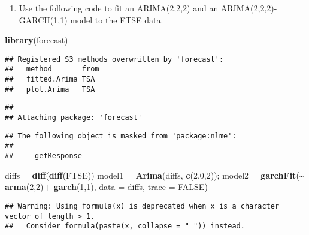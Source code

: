 \documentclass[
]{article}
\newenvironment{Shaded}{\begin{snugshade}}{\end{snugshade}}
\newcommand{\DataTypeTok}[1]{\textcolor[rgb]{0.13,0.29,0.53}{#1}}
\newcommand{\DecValTok}[1]{\textcolor[rgb]{0.00,0.00,0.81}{#1}}
\newcommand{\KeywordTok}[1]{\textcolor[rgb]{0.13,0.29,0.53}{\textbf{#1}}}
\newcommand{\NormalTok}[1]{#1}
\newcommand{\OperatorTok}[1]{\textcolor[rgb]{0.81,0.36,0.00}{\textbf{#1}}}
\newcommand{\OtherTok}[1]{\textcolor[rgb]{0.56,0.35,0.01}{#1}}
\newcommand{\StringTok}[1]{\textcolor[rgb]{0.31,0.60,0.02}{#1}}
\providecommand{\tightlist}{%
  \setlength{\itemsep}{0pt}\setlength{\parskip}{0pt}}
\begin{document}
\begin{enumerate}
\def\labelenumi{(\alph{enumi})}
\tightlist
\item
  Use the following code to fit an ARIMA(2,2,2) and an
  ARIMA(2,2,2)-GARCH(1,1) model to the FTSE data.
\end{enumerate}

\begin{Shaded}
\begin{Highlighting}[]
\KeywordTok{library}\NormalTok{(forecast)}
\end{Highlighting}
\end{Shaded}

\begin{verbatim}
## Registered S3 methods overwritten by 'forecast':
##   method       from
##   fitted.Arima TSA 
##   plot.Arima   TSA
\end{verbatim}

\begin{verbatim}
## 
## Attaching package: 'forecast'
\end{verbatim}

\begin{verbatim}
## The following object is masked from 'package:nlme':
## 
##     getResponse
\end{verbatim}

\begin{Shaded}
\begin{Highlighting}[]
\NormalTok{diffs =}\StringTok{ }\KeywordTok{diff}\NormalTok{(}\KeywordTok{diff}\NormalTok{(FTSE))}
\NormalTok{model1 =}\StringTok{ }\KeywordTok{Arima}\NormalTok{(diffs, }\KeywordTok{c}\NormalTok{(}\DecValTok{2}\NormalTok{,}\DecValTok{0}\NormalTok{,}\DecValTok{2}\NormalTok{));}
\NormalTok{model2 =}\StringTok{ }\KeywordTok{garchFit}\NormalTok{(}\OperatorTok{\textasciitilde{}}\StringTok{ }\KeywordTok{arma}\NormalTok{(}\DecValTok{2}\NormalTok{,}\DecValTok{2}\NormalTok{)}\OperatorTok{+}\StringTok{ }\KeywordTok{garch}\NormalTok{(}\DecValTok{1}\NormalTok{,}\DecValTok{1}\NormalTok{), }\DataTypeTok{data =}\NormalTok{ diffs, }\DataTypeTok{trace =} \OtherTok{FALSE}\NormalTok{)}
\end{Highlighting}
\end{Shaded}

\begin{verbatim}
## Warning: Using formula(x) is deprecated when x is a character vector of length > 1.
##   Consider formula(paste(x, collapse = " ")) instead.
\end{verbatim}
\end{document}
